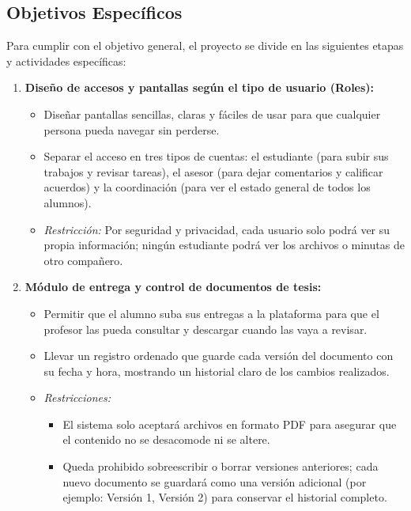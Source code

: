 \subsection{Objetivos Específicos}
\label{subsec:obj_especificos}

Para cumplir con el objetivo general, el proyecto se divide en las siguientes etapas y actividades específicas:

\begin{enumerate}
    \item \textbf{Diseño de accesos y pantallas según el tipo de usuario (Roles):}
    \begin{itemize}
        \item Diseñar pantallas sencillas, claras y fáciles de usar para que cualquier persona pueda navegar sin perderse.
        \item Separar el acceso en tres tipos de cuentas: el estudiante (para subir sus trabajos y revisar tareas), el asesor (para dejar comentarios y calificar acuerdos) y la coordinación (para ver el estado general de todos los alumnos).
        \item \textit{Restricción:} Por seguridad y privacidad, cada usuario solo podrá ver su propia información; ningún estudiante podrá ver los archivos o minutas de otro compañero.
    \end{itemize}

    \item \textbf{Módulo de entrega y control de documentos de tesis:}
    \begin{itemize}
        \item Permitir que el alumno suba sus entregas a la plataforma para que el profesor las pueda consultar y descargar cuando las vaya a revisar.
        \item Llevar un registro ordenado que guarde cada versión del documento con su fecha y hora, mostrando un historial claro de los cambios realizados.
        \item \textit{Restricciones:} 
        \begin{itemize}
            \item El sistema solo aceptará archivos en formato PDF para asegurar que el contenido no se desacomode ni se altere.
            \item Queda prohibido sobreescribir o borrar versiones anteriores; cada nuevo documento se guardará como una versión adicional (por ejemplo: Versión 1, Versión 2) para conservar el historial completo.
        \end{itemize}
    \end{itemize}


\end{enumerate}

